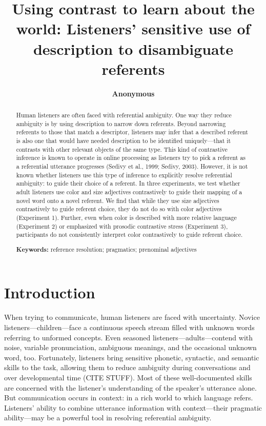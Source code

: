 \documentclass[10pt, letterpaper]{article}
\title{Using contrast to learn about the world: Listeners' sensitive use of
description to disambiguate referents}
\author{{\large \bf Anonymous}}
\begin{document}
\maketitle

\begin{abstract}
Human listeners are often faced with referential ambiguity. One way they
reduce ambiguity is by using description to narrow down referents.
Beyond narrowing referents to those that match a descriptor, listeners
may infer that a described referent is also one that would have needed
description to be identified uniquely---that it contrasts with other
relevant objects of the same type. This kind of contrastive inference is
known to operate in online processing as listeners try to pick a
referent as a referential utterance progresses (Sedivy et al., 1999;
Sedivy, 2003). However, it is not known whether listeners use this type
of inference to explicitly resolve referential ambiguity: to guide their
choice of a referent. In three experiments, we test whether adult
listeners use color and size adjectives contrastively to guide their
mapping of a novel word onto a novel referent. We find that while they
use size adjectives contrastively to guide referent choice, they do not
do so with color adjectives (Experiment 1). Further, even when color is
described with more relative language (Experiment 2) or emphasized with
prosodic contrastive stress (Experiment 3), participants do not
consistently interpret color contrastively to guide referent choice.

\textbf{Keywords:}
reference resolution; pragmatics; prenominal adjectives
\end{abstract}

\section{Introduction}\label{introduction}

When trying to communicate, human listeners are faced with uncertainty.
Novice listeners---children---face a continuous speech stream filled
with unknown words referring to unformed concepts. Even seasoned
listeners---adults---contend with noise, variable pronunciation,
ambiguous meanings, and the occasional unknown word, too. Fortunately,
listeners bring sensitive phonetic, syntactic, and semantic skills to
the task, allowing them to reduce ambiguity during conversations and
over developmental time (CITE STUFF). Most of these well-documented
skills are concerned with the listener's understanding of the speaker's
utterance alone. But communication occurs in context: in a rich world to
which language refers. Listeners' ability to combine utterance
information with context---their pragmatic ability---may be a powerful
tool in resolving referential ambiguity.
\end{document}
